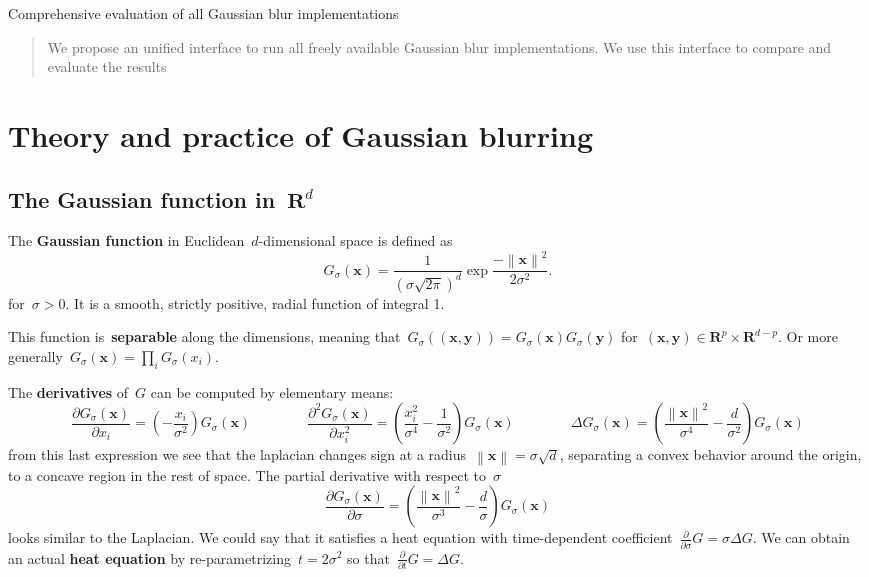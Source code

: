 \documentclass[a4paper,twoside,11pt]{article}    %
\theoremstyle{note}
\theoremstyle{plain}
\newcommand{\1}{\mathbf{1}}
\newcommand{\R}{\mathbf{R}}
\newcommand{\x}{\mathbf{x}}
\newcommand{\y}{\mathbf{y}}
\newcommand{\Abs}[1]{\left\|#1\right\|}
\begin{document}
{\Large
\begin{center}
	Comprehensive evaluation of all Gaussian blur implementations
\end{center}
}

\begin{abstract}
We propose an unified interface to run all freely available Gaussian blur
implementations.  We use this interface to compare and evaluate the results 
\end{abstract}

\section{Theory and practice of Gaussian blurring}

\subsection{The Gaussian function in~$\R^d$}

The {\bf Gaussian function} in Euclidean~$d$-dimensional space is defined as
\[
	G_{\sigma}(\x)=\frac1{\left(\sigma\sqrt{2\pi}\right)^d}\exp\frac{-\Abs{\x}^2}{2\sigma^2}.
\]
for~$\sigma>0$.
It is a smooth, strictly positive, radial function of integral 1.

This function is~{\bf separable} along the dimensions, meaning
that~$G_\sigma((\x,\y))=G_\sigma(\x)G_\sigma(\y)$
for~$(\x,\y)\in\R^p\times\R^{d-p}$.  Or more
generally~$G_\sigma(\x)=\prod_iG_\sigma(x_i)$.

The {\bf derivatives} of~$G$ can be computed by elementary means:
\[
	\frac{\partial G_\sigma(\x)}{\partial x_i}
	=
	\left(-\frac{x_i}{\sigma^2}\right)
	G_\sigma(\x)
	\qquad
	\qquad
	\frac{\partial^2 G_\sigma(\x)}{\partial x_i^2}
	=
	\left(\frac{x_i^2}{\sigma^4}-\frac1{\sigma^2}\right)
	G_\sigma(\x)
	\qquad
	\qquad
	\Delta G_\sigma(\x)
	=
	\left(\frac{\Abs{\x}^2}{\sigma^4}-\frac d{\sigma^2}\right)
	G_\sigma(\x)
\]
from this last expression we see that the laplacian changes sign at a
radius~$\Abs{\x}=\sigma\sqrt{d}$, separating a convex behavior around the
origin, to a concave region in the rest of space.
The partial derivative with respect to~$\sigma$
\[
	\frac{\partial G_\sigma(\x)}{\partial\sigma}
	=
	\left(\frac{\Abs{\x}^2}{\sigma^3}-\frac d{\sigma}\right)
	G_\sigma(\x)
\]
looks similar to the Laplacian.  We could say that it satisfies a heat
equation with time-dependent
coefficient~$\frac{\partial}{\partial\sigma}G=\sigma\Delta G$.  We can obtain
an actual {\bf heat equation} by re-parametrizing~$t=2\sigma^2$ so
that~$\frac{\partial}{\partial t}G=\Delta G$.
\end{document}

